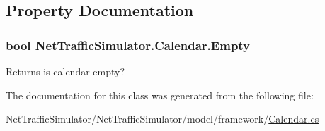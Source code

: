 \subsection{Property Documentation}
\hypertarget{classNetTrafficSimulator_1_1Calendar_a5e5fd4f549687fe607bbcb549a75799f}{
\subsubsection[{Empty}]{\setlength{\rightskip}{0pt plus 5cm}bool Net\-Traffic\-Simulator.\-Calendar.\-Empty\hspace{0.3cm}{\ttfamily [get]}}}\label{classNetTrafficSimulator_1_1Calendar_a5e5fd4f549687fe607bbcb549a75799f}
\begin{DoxyReturn}{Returns}
is calendar empty? 
\end{DoxyReturn}


The documentation for this class was generated from the following file\-:\begin{DoxyCompactItemize}
\item 
Net\-Traffic\-Simulator/\-Net\-Traffic\-Simulator/model/framework/\hyperlink{Calendar_8cs}{Calendar.\-cs}\end{DoxyCompactItemize}
